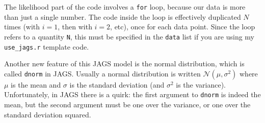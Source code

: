 The likelihood part of the code involves a {\tt for} loop, because our data
is more than just a single number. The code inside the loop is effectively
duplicated $N$ times (with $i=1$, then with $i=2$, etc), once for each data
point. Since the loop refers to a quantity {\tt N}, this must be specified in
the {\tt data} list if you are using my {\tt use\_jags.r} template code.

Another new feature of this JAGS model is the normal distribution, which is
called {\tt dnorm} in JAGS. Usually a normal distribution is written
$\mathcal{N}(\mu, \sigma^2)$ where $\mu$ is the mean and $\sigma$ is the standard
deviation (and $\sigma^2$ is the variance). Unfortunately, in JAGS there is a
quirk: the first argument to {\tt dnorm} is indeed the mean, but the second argument
must be one over the variance, or one over the standard deviation squared.

